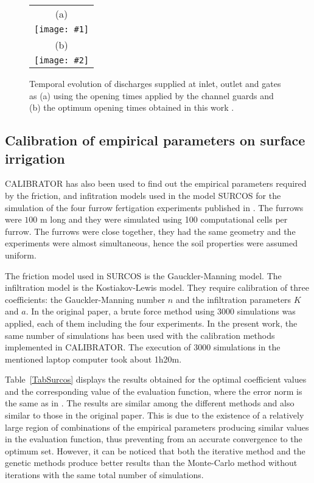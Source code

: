 \documentclass[review,authoryear]{elsarticle}
\newcommand{\FIGII}[4]
{
	\begin{figure}[ht!]
		\centering
		\begin{tabular}{c}
			(a) \\ \texttt{[image: \#1]} \\
			(b) \\ \texttt{[image: \#2]}
		\end{tabular}
		\caption{#3.\label{#4}}
	\end{figure}
}
\begin{document}
\FIGII{Violada-contributions.eps}{Violada-optimized-contributions.eps}
{
	Temporal evolution of discharges supplied at inlet, outlet and gates as (a)
	using the opening times applied by the channel guards and (b) the optimum 
	opening times obtained in this work
}{FigSwigs}

\subsection{Calibration of empirical parameters on surface irrigation}

CALIBRATOR has also been used to find out the empirical parameters required by the friction, and infitration
models used in the model SURCOS \citep{Surcos,SurcosGit,JaviSurcos3} for the simulation of the four furrow fertigation experiments published in \citet{JaviSurcos2}. The furrows were $100$ m long and they were simulated using 100 computational cells per furrow. The furrows were close together, they had the same geometry and the experiments were almost simultaneous, hence the soil properties were assumed uniform. 

The friction model used in SURCOS is the Gauckler-Manning model. The infiltration model is the Kostiakov-Lewis model. They require calibration of three coefficients: the Gauckler-Manning number $n$ and the infiltration parameters $K$ and $a$. In the original paper, a brute force method using 3000 simulations was applied, each of them including the four experiments. In the present work, the same number of simulations has been used with the calibration methods implemented in CALIBRATOR. The execution of 3000 simulations in the mentioned laptop computer took about 1h20m.  

Table~\ref{TabSurcos} displays the results obtained for the optimal coefficient values and the corresponding
value of the evaluation function, where the error norm is the same as in \citet{JaviSurcos2}. The results are similar among the different methods and also similar to those in the original paper. This is due to the existence of a relatively large region of combinations of the empirical parameters producing similar values in the evaluation function, thus preventing from an accurate convergence to the optimum set. However, it can be noticed that both the iterative method and the genetic methods produce better results than the Monte-Carlo method without iterations with the same total number of simulations.
\end{document}
